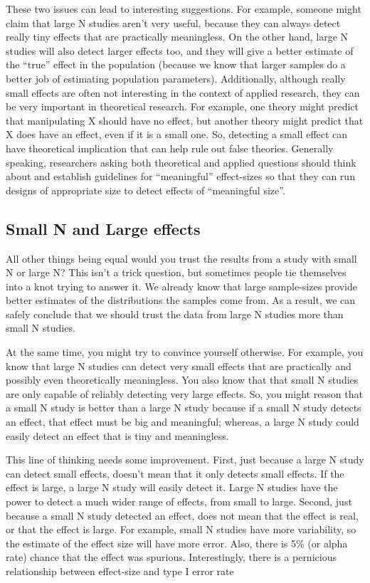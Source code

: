 \documentclass[
  letterpaper,
  DIV=11,
  numbers=noendperiod]{scrreprt}
\begin{document}
These two issues can lead to interesting suggestions. For example,
someone might claim that large N studies aren't very useful, because
they can always detect really tiny effects that are practically
meaningless. On the other hand, large N studies will also detect larger
effects too, and they will give a better estimate of the ``true'' effect
in the population (because we know that larger samples do a better job
of estimating population parameters). Additionally, although really
small effects are often not interesting in the context of applied
research, they can be very important in theoretical research. For
example, one theory might predict that manipulating X should have no
effect, but another theory might predict that X does have an effect,
even if it is a small one. So, detecting a small effect can have
theoretical implication that can help rule out false theories. Generally
speaking, researchers asking both theoretical and applied questions
should think about and establish guidelines for ``meaningful''
effect-sizes so that they can run designs of appropriate size to detect
effects of ``meaningful size''.

\subsection{Small N and Large
effects}\label{small-n-and-large-effects-1}

All other things being equal would you trust the results from a study
with small N or large N? This isn't a trick question, but sometimes
people tie themselves into a knot trying to answer it. We already know
that large sample-sizes provide better estimates of the distributions
the samples come from. As a result, we can safely conclude that we
should trust the data from large N studies more than small N studies.

At the same time, you might try to convince yourself otherwise. For
example, you know that large N studies can detect very small effects
that are practically and possibly even theoretically meaningless. You
also know that that small N studies are only capable of reliably
detecting very large effects. So, you might reason that a small N study
is better than a large N study because if a small N study detects an
effect, that effect must be big and meaningful; whereas, a large N study
could easily detect an effect that is tiny and meaningless.

This line of thinking needs some improvement. First, just because a
large N study can detect small effects, doesn't mean that it only
detects small effects. If the effect is large, a large N study will
easily detect it. Large N studies have the power to detect a much wider
range of effects, from small to large. Second, just because a small N
study detected an effect, does not mean that the effect is real, or that
the effect is large. For example, small N studies have more variability,
so the estimate of the effect size will have more error. Also, there is
5\% (or alpha rate) chance that the effect was spurious. Interestingly,
there is a pernicious relationship between effect-size and type I error
rate
\end{document}
